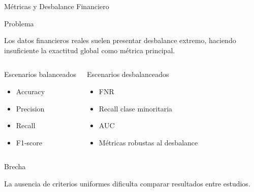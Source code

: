 \documentclass[aspectratio=169, 8pt]{beamer}
\begin{document}
\begin{frame}{Métricas y Desbalance Financiero}

\begin{block}{Problema}

Los datos financieros reales suelen presentar
desbalance extremo, haciendo insuficiente
la exactitud global como métrica principal.

\end{block}

\vspace{0.2cm}

\begin{columns}


\begin{block}{Escenarios balanceados}

\begin{itemize}

\item Accuracy

\item Precision

\item Recall

\item F1-score

\end{itemize}

\end{block}



\begin{block}{Escenarios desbalanceados}

\begin{itemize}

\item FNR

\item Recall clase minoritaria

\item AUC

\item Métricas robustas al desbalance

\end{itemize}

\end{block}

\end{columns}

\vspace{0.25cm}

\begin{alertblock}{Brecha}

La ausencia de criterios uniformes
dificulta comparar resultados entre estudios.

\end{alertblock}

\end{frame}
\end{document}
